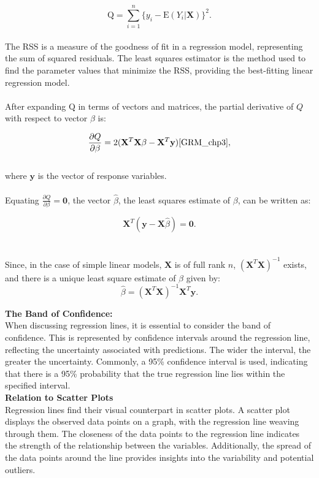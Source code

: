 \documentclass{article}\usepackage[]{graphicx}\usepackage[]{xcolor}
\begin{document}
$$\mathrm{Q} = \sum_{i=1}^{n} \{y_i - \mathrm{E} (Y_i | \mathbf{X})\}^2 .$$
\\The RSS is a measure of the goodness of fit in a regression model, representing the sum of squared residuals. The least squares estimator is the method used to find the parameter values that minimize the RSS, providing the best-fitting linear regression model.
\\ 
\\After expanding $\mathrm{Q}$ in terms of vectors and matrices,  the partial derivative of $Q$ with respect to vector $\beta$ is:

$$\frac{\partial Q}{\partial \beta} = 2(\mathbf{X}^T\mathbf{X}\beta - \mathbf{X}^T\mathbf{y})\cite{GRM_chp3},$$
\\where $\mathbf{y}$ is the vector of response variables.
\\  
\\Equating $\frac{\partial Q}{\partial \beta} = \mathbf{0}$, the vector $\hat{\beta}$,  the least squares estimate of $\beta$, can be written as:

$$\mathbf{X}^T(\mathbf{y}-\mathbf{X}\hat{\beta})=\mathbf{0}.$$
\\  
\\Since, in the case of simple linear models, $\mathbf{X}$ is of full rank $n$, $(\mathbf{X}^T\mathbf{X})^{-1}$ exists, and there is a unique least square estimate of $\beta$ given by:
$$\hat{\beta} = (\mathbf{X}^T\mathbf{X})^{-1}\mathbf{X}^T\mathbf{y}.$$

\noindent
\textbf{The Band of Confidence:}\\

\noindent
When discussing regression lines, it is essential to consider the band of confidence. This is represented by confidence intervals around the regression line, reflecting the uncertainty associated with predictions. The wider the interval, the greater the uncertainty. Commonly, a 95\% confidence interval is used, indicating that there is a 95\% probability that the true regression line lies within the specified interval.\\

\noindent
\textbf{Relation to Scatter Plots}\\

\noindent
Regression lines find their visual counterpart in scatter plots. A scatter plot displays the observed data points on a graph, with the regression line weaving through them. The closeness of the data points to the regression line indicates the strength of the relationship between the variables. Additionally, the spread of the data points around the line provides insights into the variability and potential outliers.\\
\end{document}
